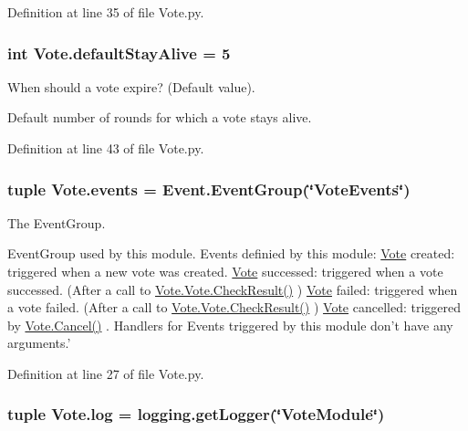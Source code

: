 Definition at line 35 of file Vote.py.

\hypertarget{namespace_vote_a3ed2d759405d2be1e6f53c128aef371a}{
\subsubsection[{defaultStayAlive}]{\setlength{\rightskip}{0pt plus 5cm}int {\bf Vote.defaultStayAlive} = 5}}
\label{namespace_vote_a3ed2d759405d2be1e6f53c128aef371a}


When should a vote expire? (Default value). 

Default number of rounds for which a vote stays alive. 

Definition at line 43 of file Vote.py.

\hypertarget{namespace_vote_a611c4a69371fcbdcc7683a654b737a14}{
\subsubsection[{events}]{\setlength{\rightskip}{0pt plus 5cm}tuple {\bf Vote.events} = {\bf Event.EventGroup}(\char`\"{}VoteEvents\char`\"{})}}
\label{namespace_vote_a611c4a69371fcbdcc7683a654b737a14}


The EventGroup. 

EventGroup used by this module. Events definied by this module: \hyperlink{namespace_vote}{Vote} created: triggered when a new vote was created. \hyperlink{namespace_vote}{Vote} successed: triggered when a vote successed. (After a call to \hyperlink{class_vote_1_1_vote_acda3525e83e91d9e4622218635f92d4b}{Vote.Vote.CheckResult()} ) \hyperlink{namespace_vote}{Vote} failed: triggered when a vote failed. (After a call to \hyperlink{class_vote_1_1_vote_acda3525e83e91d9e4622218635f92d4b}{Vote.Vote.CheckResult()} ) \hyperlink{namespace_vote}{Vote} cancelled: triggered by \hyperlink{namespace_vote_a5d75127361161b29f9a36a7f8d3cc1ed}{Vote.Cancel()} . Handlers for Events triggered by this module don't have any arguments.' 

Definition at line 27 of file Vote.py.

\hypertarget{namespace_vote_a081b01b11b311cef57a1bd37c864d363}{
\subsubsection[{log}]{\setlength{\rightskip}{0pt plus 5cm}tuple {\bf Vote.log} = logging.getLogger(\char`\"{}VoteModule\char`\"{})}}
\label{namespace_vote_a081b01b11b311cef57a1bd37c864d363}


